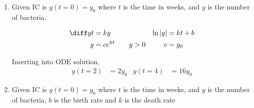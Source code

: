 \begin{enumerate}
    \item Given IC is $y(t = 0) = y_{0}$ where $ t $ is the time in weeks, and $ y $
          is the number of bacteria.

          \begin{align}
              \diff yt       & = ky                  &
              \ln        |y| & = kt + b                \\
              y              & = c e^{kt} \qquad y>0 &
              c              & = y_{0}
          \end{align}
          \begin{figure}[H]
              \centering
          \end{figure}
          Inserting into ODE solution,
          \begin{align}
              y(t = 2) & = 2y_{0}   &
              y(t = 4) & = 16 y_{0}
          \end{align}


    \item Given IC is $y(t = 0) = y_{0}$ where $ t $ is the time in weeks, and $ y $
          is the number of bacteria, $ b $ is the birth rate and $ k $ is the death rate


\end{enumerate}
